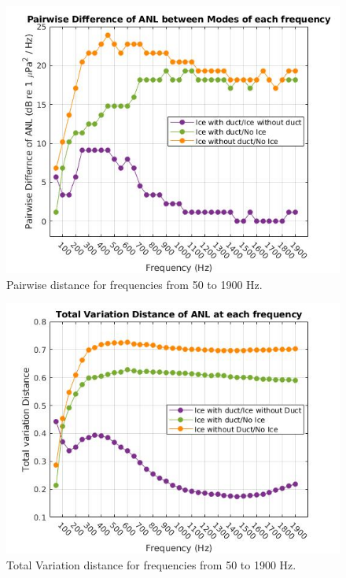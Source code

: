 \begin{figure}[p]
\centering
\includegraphics[scale=0.6]{Figures/recolor_pairwise_dist_ANLs.jpg}
\caption{Pairwise distance for frequencies from 50 to 1900 Hz.}
\label{fig_pairwisedist}
\end{figure}

\begin{figure}[p]
\centering
\includegraphics[scale=0.62]{Figures/recolor_total_var_dist_norm_pdf.jpg}
\caption{Total Variation distance for frequencies from 50 to 1900 Hz.}
\label{fig_totvardist}
\end{figure}

